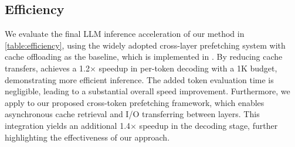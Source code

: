 \subsection{Efficiency}

We evaluate the final LLM inference acceleration of our method in \autoref{table:efficiency}, using the widely adopted cross-layer prefetching system with cache offloading as the baseline, which is implemented in \citet{wolf-etal-2020-transformers}.
By reducing cache transfers, \ours achieves a 1.2$\times$ speedup in per-token decoding with a 1K budget, demonstrating more efficient inference. 
The added token evaluation time is negligible, leading to a substantial overall speed improvement.
Furthermore, we apply \ours to our proposed cross-token prefetching framework, which enables asynchronous cache retrieval and I/O transferring between layers. This integration yields an additional 1.4$\times$ speedup in the decoding stage, further highlighting the effectiveness of our approach.

\begin{table}[h]
\centering
\caption{The decode latency of per token of LLaMA-3.1-8B with 32K context length.}
\label{table:efficiency}
\end{table}

